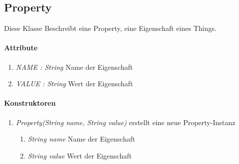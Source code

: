 \subsection{Property}
Diese Klasse Beschreibt eine Property, eine Eigenschaft eines Things.

\paragraph{Attribute}
\begin{enumerate}[$\bullet$]
	\item \textit{NAME : String} Name der Eigenschaft
	\item \textit{VALUE : String} Wert der Eigenschaft
\end{enumerate}

\paragraph{Konstruktoren}
\begin{enumerate}[+]
	\item \textit{ Property(String name, String value)}
	erstellt eine neue Property-Instanz
	\begin{enumerate}[$\bullet$]
		\item \textit{String name} Name der Eigenschaft
		\item \textit{String value} Wert der Eigenschaft
	\end{enumerate}
	
\end{enumerate}
